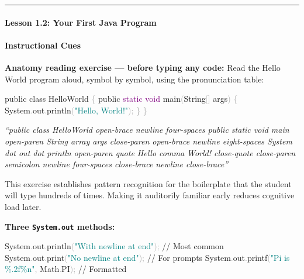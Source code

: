 \documentclass[
  justified,
  openright,
]{tufte-book}
\let\subsubsection\paragraph
\let\paragraph\paragraph
\newcommand{\BuiltInTok}[1]{#1}
\newcommand{\CommentTok}[1]{\textcolor{MidGray}{#1}}
\newcommand{\DataTypeTok}[1]{\textcolor{Purple}{#1}}
\newcommand{\FunctionTok}[1]{\textcolor{BrandBlue}{#1}}
\newcommand{\KeywordTok}[1]{\textcolor{BrandBlue}{#1}}
\newcommand{\NormalTok}[1]{#1}
\newcommand{\OperatorTok}[1]{\textcolor{DarkGray}{#1}}
\newcommand{\SpecialCharTok}[1]{\textcolor{Teal}{#1}}
\newcommand{\StringTok}[1]{\textcolor{Teal}{#1}}
\newenvironment{Shaded}{%
  \begin{snugshade}
}{%
  \end{snugshade}
}
\let\subsubsection\paragraph
\let\paragraph\paragraph
\begin{document}
\begin{center}\rule{0.5\linewidth}{0.5pt}\end{center}

\subsubsection{Lesson 1.2: Your First Java
Program}\label{lesson-1.2-your-first-java-program}

\paragraph{Instructional Cues}\label{instructional-cues-1}

\textbf{Anatomy reading exercise --- before typing any code:} Read the
Hello World program aloud, symbol by symbol, using the pronunciation
table:

\begin{Shaded}
\begin{Highlighting}[]
\KeywordTok{public} \KeywordTok{class}\NormalTok{ HelloWorld }\OperatorTok{\{}
    \KeywordTok{public} \DataTypeTok{static} \DataTypeTok{void} \FunctionTok{main}\OperatorTok{(}\BuiltInTok{String}\OperatorTok{[]}\NormalTok{ args}\OperatorTok{)} \OperatorTok{\{}
        \BuiltInTok{System}\OperatorTok{.}\FunctionTok{out}\OperatorTok{.}\FunctionTok{println}\OperatorTok{(}\StringTok{"Hello, World!"}\OperatorTok{);}
    \OperatorTok{\}}
\OperatorTok{\}}
\end{Highlighting}
\end{Shaded}

\emph{``public class HelloWorld open-brace newline four-spaces public
static void main open-paren String array args close-paren open-brace
newline eight-spaces System dot out dot println open-paren quote Hello
comma World! close-quote close-paren semicolon newline four-spaces
close-brace newline close-brace''}

This exercise establishes pattern recognition for the boilerplate that
the student will type hundreds of times. Making it auditorily familiar
early reduces cognitive load later.

\textbf{Three \texttt{System.out} methods:}

\begin{Shaded}
\begin{Highlighting}[]
\BuiltInTok{System}\OperatorTok{.}\FunctionTok{out}\OperatorTok{.}\FunctionTok{println}\OperatorTok{(}\StringTok{"With newline at end"}\OperatorTok{);}     \CommentTok{// Most common}
\BuiltInTok{System}\OperatorTok{.}\FunctionTok{out}\OperatorTok{.}\FunctionTok{print}\OperatorTok{(}\StringTok{"No newline at end"}\OperatorTok{);}          \CommentTok{// For prompts}
\BuiltInTok{System}\OperatorTok{.}\FunctionTok{out}\OperatorTok{.}\FunctionTok{printf}\OperatorTok{(}\StringTok{"Pi is }\SpecialCharTok{\%.2f\%n}\StringTok{"}\OperatorTok{,} \BuiltInTok{Math}\OperatorTok{.}\FunctionTok{PI}\OperatorTok{);}    \CommentTok{// Formatted}
\end{Highlighting}
\end{Shaded}
\end{document}
